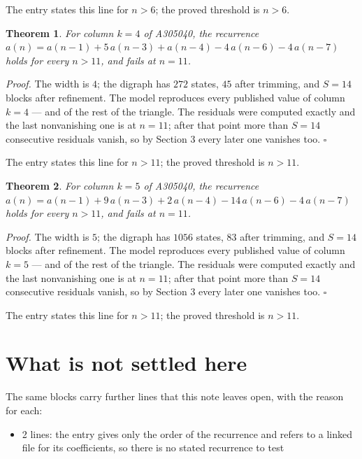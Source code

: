 \documentclass[11pt]{article}
\newtheorem{theorem}{Theorem}
\theoremstyle{definition}
\begin{document}
The entry states this line for $n > 6$; the proved threshold is $n > 6$.

\begin{theorem} For column $k = 4$ of A305040, the recurrence $a(n) = a(n-1) + 5\,a(n-3) + a(n-4) - 4\,a(n-6) - 4\,a(n-7)$ holds for every $n > 11$, and fails at $n = 11$.\end{theorem}

{\itshape Proof.} The width is $4$; the digraph has $272$ states, $45$ after trimming, and $S = 14$ blocks after refinement. The model reproduces every published value of column $k = 4$ --- and of the rest of the triangle. The residuals were computed exactly and the last nonvanishing one is at $n = 11$; after that point more than $S = 14$ consecutive residuals vanish, so by Section 3 every later one vanishes too. $\square$

The entry states this line for $n > 11$; the proved threshold is $n > 11$.

\begin{theorem} For column $k = 5$ of A305040, the recurrence $a(n) = a(n-1) + 9\,a(n-3) + 2\,a(n-4) - 14\,a(n-6) - 4\,a(n-7)$ holds for every $n > 11$, and fails at $n = 11$.\end{theorem}

{\itshape Proof.} The width is $5$; the digraph has $1056$ states, $83$ after trimming, and $S = 14$ blocks after refinement. The model reproduces every published value of column $k = 5$ --- and of the rest of the triangle. The residuals were computed exactly and the last nonvanishing one is at $n = 11$; after that point more than $S = 14$ consecutive residuals vanish, so by Section 3 every later one vanishes too. $\square$

The entry states this line for $n > 11$; the proved threshold is $n > 11$.

\section{What is not settled here}

The same blocks carry further lines that this note leaves open, with the reason for each:

\begin{itemize}

\item 2 lines: the entry gives only the order of the recurrence and refers to a linked file for its coefficients, so there is no stated recurrence to test

\end{itemize}
\end{document}
